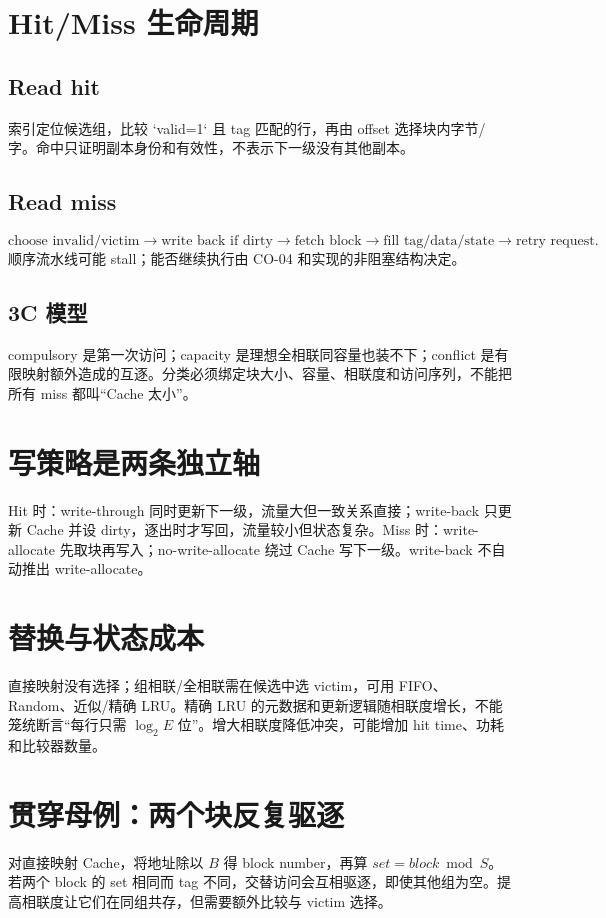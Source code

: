 \documentclass[UTF8,fontset=fandol,11pt,a4paper]{ctexart}
\begin{document}
\section{Hit/Miss 生命周期}
\subsection{Read hit}
索引定位候选组，比较 `valid=1` 且 tag 匹配的行，再由 offset 选择块内字节/字。命中只证明副本身份和有效性，不表示下一级没有其他副本。

\subsection{Read miss}
\[
\text{choose invalid/victim}\to\text{write back if dirty}\to\text{fetch block}\to\text{fill tag/data/state}\to\text{retry request}.
\]
顺序流水线可能 stall；能否继续执行由 CO-04 和实现的非阻塞结构决定。

\subsection{3C 模型}
compulsory 是第一次访问；capacity 是理想全相联同容量也装不下；conflict 是有限映射额外造成的互逐。分类必须绑定块大小、容量、相联度和访问序列，不能把所有 miss 都叫“Cache 太小”。

\section{写策略是两条独立轴}
Hit 时：write-through 同时更新下一级，流量大但一致关系直接；write-back 只更新 Cache 并设 dirty，逐出时才写回，流量较小但状态复杂。Miss 时：write-allocate 先取块再写入；no-write-allocate 绕过 Cache 写下一级。write-back 不自动推出 write-allocate。

\section{替换与状态成本}
直接映射没有选择；组相联/全相联需在候选中选 victim，可用 FIFO、Random、近似/精确 LRU。精确 LRU 的元数据和更新逻辑随相联度增长，不能笼统断言“每行只需 $\log_2E$ 位”。增大相联度降低冲突，可能增加 hit time、功耗和比较器数量。

\section{贯穿母例：两个块反复驱逐}
对直接映射 Cache，将地址除以 $B$ 得 block number，再算 $set=block\bmod S$。若两个 block 的 set 相同而 tag 不同，交替访问会互相驱逐，即使其他组为空。提高相联度让它们在同组共存，但需要额外比较与 victim 选择。
\end{document}
